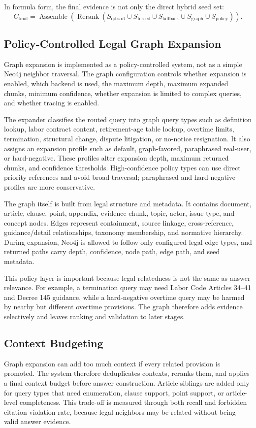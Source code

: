 In formula form, the final evidence is not only the direct hybrid seed set:
\[
C_{\mathrm{final}} =
\operatorname{Assemble}
\left(
\operatorname{Rerank}
\left(
S_{\mathrm{qdrant}}
\cup S_{\mathrm{forced}}
\cup S_{\mathrm{fallback}}
\cup S_{\mathrm{graph}}
\cup S_{\mathrm{policy}}
\right)
\right).
\]

\subsection{Policy-Controlled Legal Graph Expansion}
Graph expansion is implemented as a policy-controlled system, not as a simple Neo4j neighbor traversal. The graph configuration controls whether expansion is enabled, which backend is used, the maximum depth, maximum expanded chunks, minimum confidence, whether expansion is limited to complex queries, and whether tracing is enabled.

The expander classifies the routed query into graph query types such as definition lookup, labor contract content, retirement-age table lookup, overtime limits, termination, structural change, dispute litigation, or no-notice resignation. It also assigns an expansion profile such as default, graph-favored, paraphrased real-user, or hard-negative. These profiles alter expansion depth, maximum returned chunks, and confidence thresholds. High-confidence policy types can use direct priority references and avoid broad traversal; paraphrased and hard-negative profiles are more conservative.

The graph itself is built from legal structure and metadata. It contains document, article, clause, point, appendix, evidence chunk, topic, actor, issue type, and concept nodes. Edges represent containment, source linkage, cross-reference, guidance/detail relationships, taxonomy membership, and normative hierarchy. During expansion, Neo4j is allowed to follow only configured legal edge types, and returned paths carry depth, confidence, node path, edge path, and seed metadata.

This policy layer is important because legal relatedness is not the same as answer relevance. For example, a termination query may need Labor Code Articles 34--41 and Decree 145 guidance, while a hard-negative overtime query may be harmed by nearby but different overtime provisions. The graph therefore adds evidence selectively and leaves ranking and validation to later stages.

\subsection{Context Budgeting}
Graph expansion can add too much context if every related provision is promoted. The system therefore deduplicates contexts, reranks them, and applies a final context budget before answer construction. Article siblings are added only for query types that need enumeration, clause support, point support, or article-level completeness. This trade-off is measured through both recall and forbidden citation violation rate, because legal neighbors may be related without being valid answer evidence.

